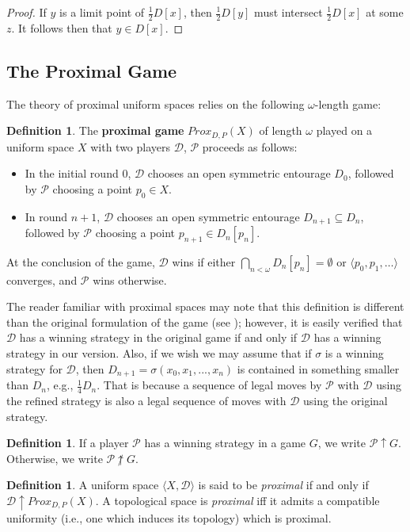 \documentclass{amsart}
\theoremstyle{definition}
\newtheorem{defn}[thm]{Definition}
\theoremstyle{remark}
\newcommand{\<}{\langle}
\renewcommand{\>}{\rangle}
\newcommand{\proxgame}[1]{Prox_{D,P}(#1)}
\newcommand{\pl}[1]{\mathscr{#1}}
\newcommand{\win}{\uparrow}
\newcommand{\term}{\textit}
\begin{document}
\begin{proof}
  If $y$ is a limit point of $\frac{1}{2}D[x]$, then $\frac{1}{2}D[y]$ must intersect $\frac{1}{2}D[x]$ at some $z$. It follows then that $y\in D[x]$.
\end{proof}

\subsection{The Proximal Game}

The theory of proximal uniform spaces relies on the following $\omega$-length game:

\begin{defn}
  The \textbf{proximal game} $\proxgame{X}$ of length $\omega$ played on a uniform space $X$ with two players $\pl D$, $\pl P$ proceeds as follows:
    \begin{itemize}
      \item In the initial round $0$, $\pl D$ chooses an open symmetric entourage $D_0$, followed by $\pl P$ choosing a point $p_0\in X$.
      \item In round $n+1$, $\pl D$ chooses an open symmetric entourage $D_{n+1}\subseteq D_n$, followed by $\pl P$ choosing a point $p_{n+1}\in D_n[p_n]$.
    \end{itemize}
  At the conclusion of the game, $\pl D$ wins if either $\bigcap_{n<\omega}D_n[p_n]=\emptyset$ or $\<p_0,p_1,\dots\>$ converges, and $\pl P$ wins otherwise.
\end{defn}

The reader familiar with proximal spaces may note that this definition is different than the original formulation of the game (see \cite{b}); however, it is easily verified that $\pl D$ has a winning strategy in the original game if and only if $\pl D$ has a winning strategy in our version.   Also, if we wish we may assume that if $\sigma$ is a winning strategy for $\pl D$, then $D_{n+1}=\sigma (x_0,x_1,...,x_n)$ is contained in something smaller than $D_n$, e.g., $\frac{1}{4}D_n$.  That is because a sequence of legal moves by $\pl P$ with $\pl D$ using the refined strategy is also a legal sequence of moves with $\pl D$ using the original strategy.

\begin{defn}
  If a player $\pl P$ has a winning strategy in a game $G$, we write $\pl P\win G$. Otherwise, we write $\pl P\not\win G$.
\end{defn}

\begin{defn}
  A uniform space $\<X,\mathcal D\>$ is said to be \term{proximal} if and only if $\pl D\win\proxgame{X}$.  A topological space is \term{proximal} iff it admits  a compatible uniformity (i.e., one which induces its topology) which is proximal.
\end{defn}
\end{document}
